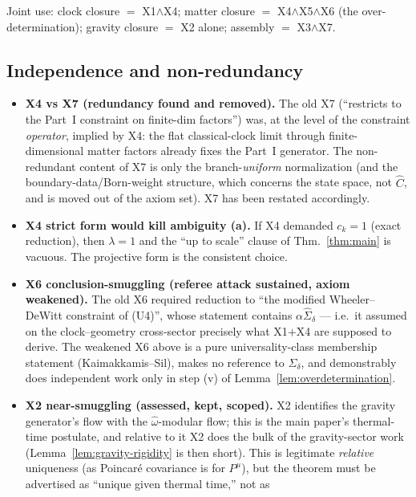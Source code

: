 \documentclass[11pt,a4paper]{article}
\theoremstyle{definition}
\theoremstyle{remark}
\begin{document}
Joint use: clock closure $=$ X1$\wedge$X4; matter closure $=$
X4$\wedge$X5$\wedge$X6 (the over-determination); gravity
closure $=$ X2 alone; assembly $=$ X3$\wedge$X7.

\subsection*{Independence and non-redundancy}

\begin{itemize}[leftmargin=*,nosep]
  \item \textbf{X4 vs X7 (redundancy found and removed).} The
    old X7 (``restricts to the Part~I constraint on finite-dim
    factors'') was, at the level of the constraint
    \emph{operator}, implied by X4: the flat classical-clock
    limit through finite-dimensional matter factors already
    fixes the Part~I generator. The non-redundant content of
    X7 is only the branch-\emph{uniform} normalization (and the
    boundary-data/Born-weight structure, which concerns the
    state space, not $\widehat C$, and is moved out of the
    axiom set). X7 has been restated accordingly.
  \item \textbf{X4 strict form would kill ambiguity (a).} If
    X4 demanded $c_k=1$ (exact reduction), then $\lambda=1$
    and the ``up to scale'' clause of Thm.~\ref{thm:main} is
    vacuous. The projective form is the consistent choice.
  \item \textbf{X6 conclusion-smuggling (referee attack
    sustained, axiom weakened).} The old X6 required reduction
    to ``the modified Wheeler--DeWitt constraint of (U4)'',
    whose statement contains $\alpha\widehat\Sigma_\delta$ ---
    i.e.\ it assumed on the clock--geometry cross-sector
    precisely what X1$+$X4 are supposed to derive. The
    weakened X6 above is a pure universality-class membership
    statement (Kaimakkamis--Sil), makes no reference to
    $\Sigma_\delta$, and demonstrably does independent work
    only in step (v) of Lemma~\ref{lem:overdetermination}.
  \item \textbf{X2 near-smuggling (assessed, kept, scoped).}
    X2 identifies the gravity generator's flow with the
    $\hat\omega$-modular flow; this is the main paper's
    thermal-time postulate, and relative to it X2 does the
    bulk of the gravity-sector work
    (Lemma~\ref{lem:gravity-rigidity} is then short). This is
    legitimate \emph{relative} uniqueness (as Poincar\'e
    covariance is for $P^\mu$), but the theorem must be
    advertised as ``unique given thermal time,'' not as

\end{itemize}
\end{document}
